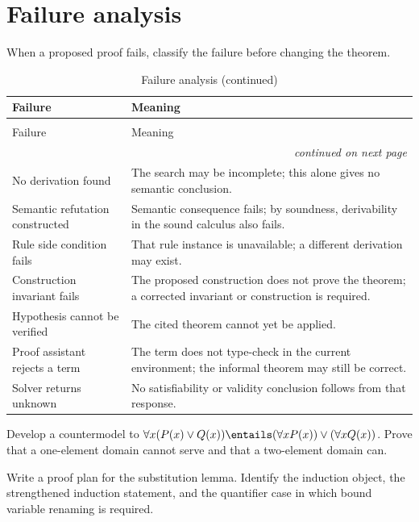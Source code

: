 \section{Failure analysis}
\label{sec:formal-practice-05}

When a proposed proof fails, classify the failure before changing the theorem.
\begin{longtable}{@{}p{}p{}@{}}
\caption{Failure analysis}\\
\toprule
Failure & Meaning \\
\midrule
\endfirsthead
\caption[]{Failure analysis (continued)}\\
\toprule
Failure & Meaning \\
\midrule
\endhead
\midrule\multicolumn{2}{r}{\emph{continued on next page}}\\
\endfoot
\endlastfoot
No derivation found & The search may be incomplete; this alone gives no
semantic conclusion. \\
Semantic refutation constructed & Semantic consequence fails; by soundness,
derivability in the sound calculus also fails. \\
Rule side condition fails & That rule instance is unavailable; a different
derivation may exist. \\
Construction invariant fails & The proposed construction does not prove the
theorem; a corrected invariant or construction is required. \\
Hypothesis cannot be verified & The cited theorem cannot yet be applied. \\
Proof assistant rejects a term & The term does not type-check in the current
environment; the informal theorem may still be correct. \\
Solver returns unknown & No satisfiability or validity conclusion follows from
that response. \\
\bottomrule
\end{longtable}

\begin{exercise}
\label{ex:formal-practice-01}
Develop a countermodel to
\(\forall x(P(x)\lor Q(x))\entails
(\forall xP(x))\lor(\forall xQ(x))\).  Prove that a one-element domain cannot
serve and that a two-element domain can.
\end{exercise}

\begin{exercise}
\label{ex:formal-practice-02}
Write a proof plan for the substitution lemma.  Identify the induction object,
the strengthened induction statement, and the quantifier case in which bound
variable renaming is required.
\end{exercise}

